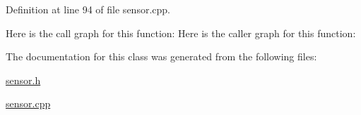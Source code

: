 Definition at line 94 of file sensor.\+cpp.

Here is the call graph for this function\+:
Here is the caller graph for this function\+:


The documentation for this class was generated from the following files\+:\begin{DoxyCompactItemize}
\item 
\mbox{\hyperlink{sensor_8h}{sensor.\+h}}\item 
\mbox{\hyperlink{sensor_8cpp}{sensor.\+cpp}}\end{DoxyCompactItemize}
